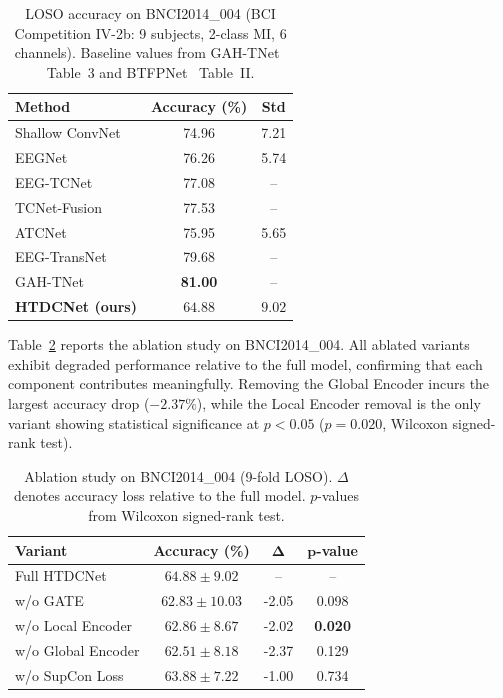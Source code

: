 \documentclass[conference]{IEEEtran}
\begin{document}
\begin{table}[ht]
\centering
\caption{LOSO accuracy on BNCI2014\_004 (BCI Competition IV-2b: 9 subjects, 2-class MI, 6 channels). Baseline values from GAH-TNet~\cite{altuwairqi2022gah} Table~3 and BTFPNet~\cite{btfpnet2024} Table~II.}
\label{tab:bnci_comparison}
\begin{tabular}{lcc}
\toprule
\textbf{Method} & \textbf{Accuracy (\%)} & \textbf{Std} \\
\midrule
Shallow ConvNet~\cite{schirrmeister2017deep} & 74.96 & 7.21 \\
EEGNet~\cite{lawhern2018eegnet} & 76.26 & 5.74 \\
EEG-TCNet~\cite{ingolfsson2020eeg} & 77.08 & -- \\
TCNet-Fusion~\cite{ingolfsson2020eeg} & 77.53 & -- \\
ATCNet~\cite{altaheri2023atcnet} & 75.95 & 5.65 \\
EEG-TransNet~\cite{ma2024eegtransnet} & 79.68 & -- \\
GAH-TNet~\cite{altuwairqi2022gah} & \textbf{81.00} & -- \\
\midrule
\textbf{HTDCNet (ours)} & $64.88$ & $9.02$ \\
\bottomrule
\end{tabular}
\end{table}

Table~\ref{tab:ablation} reports the ablation study on BNCI2014\_004. All ablated variants exhibit degraded performance relative to the full model, confirming that each component contributes meaningfully. Removing the Global Encoder incurs the largest accuracy drop ($-2.37\%$), while the Local Encoder removal is the only variant showing statistical significance at $p < 0.05$ ($p = 0.020$, Wilcoxon signed-rank test).

\begin{table}[ht]
\centering
\caption{Ablation study on BNCI2014\_004 (9-fold LOSO). $\Delta$ denotes accuracy loss relative to the full model. $p$-values from Wilcoxon signed-rank test.}
\label{tab:ablation}
\begin{tabular}{lccc}
\toprule
\textbf{Variant} & \textbf{Accuracy (\%)} & $\boldsymbol{\Delta}$ & $\boldsymbol{p}$\textbf{-value} \\
\midrule
Full HTDCNet & $64.88 \pm 9.02$ & -- & -- \\
w/o GATE & $62.83 \pm 10.03$ & -2.05 & 0.098 \\
w/o Local Encoder & $62.86 \pm 8.67$ & -2.02 & \textbf{0.020} \\
w/o Global Encoder & $62.51 \pm 8.18$ & -2.37 & 0.129 \\
w/o SupCon Loss & $63.88 \pm 7.22$ & -1.00 & 0.734 \\
\bottomrule
\end{tabular}
\end{table}
\end{document}
